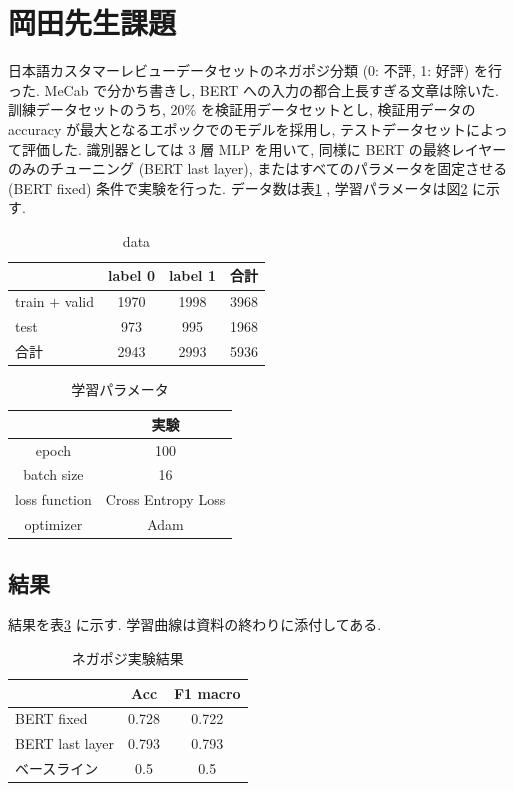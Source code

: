 \documentclass[twocolumn]{jarticle}     %
\begin{document}
\section{岡田先生課題}
日本語カスタマーレビューデータセットのネガポジ分類 (0: 不評, 1: 好評) を行った. MeCab で分かち書きし, BERT への入力の都合上長すぎる文章は除いた. 訓練データセットのうち, 20\% を検証用データセットとし, 検証用データの accuracy が最大となるエポックでのモデルを採用し, テストデータセットによって評価した. 識別器としては 3 層 MLP を用いて, 同様に BERT の最終レイヤーのみのチューニング (BERT last layer), またはすべてのパラメータを固定させる (BERT fixed) 条件で実験を行った. データ数は表\ref{table:data} , 学習パラメータは図\ref{table:ex_para} に示す.

\begin{table}
\caption{data}
\label{table:data}
\centering
\begin{tabular}{lccl}
\hline
 & label 0 & label 1 & 合計 \\ \hline
train $+$ valid & 1970 & 1998 & 3968 \\
test & 973 & 995 & 1968 \\ \hline
合計 & 2943 & 2993 & 5936 \\ \hline
\end{tabular}
\end{table}


\begin{table}
\caption{学習パラメータ}
\label{table:ex_para}
\centering
\begin{tabular}{|c||c|c|}
\hline
& \multicolumn{2}{|c|}{実験} \\ \hline
epoch & \multicolumn{2}{|c|}{100}  \\ \hline
batch size & \multicolumn{2}{|c|}{16} \\ \hline
loss function & \multicolumn{2}{|c|}{Cross Entropy Loss} \\ \hline
optimizer & \multicolumn{2}{|c|}{Adam} \\ \hline
\end{tabular}
\end{table}

\subsection{結果}
結果を表\ref{table:result_negaposi} に示す. 学習曲線は資料の終わりに添付してある.

\begin{table}[]
\caption{ネガポジ実験結果}
\label{table:result_negaposi}
\centering
\begin{tabular}{l|cc}
\hline
 & Acc & F1 macro \\ \hline
BERT fixed & 0.728 & 0.722 \\
BERT last layer & 0.793 & 0.793 \\ \hline
ベースライン & 0.5 & 0.5\\ \hline
\end{tabular}
\end{table}
\end{document}
